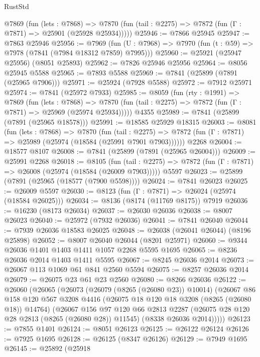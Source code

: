 \begin{lexlean}{RustStd}
\begin{coremodule}
{\begin{coremodule}
{{{{{{{{{{{{{{{{{{{{{{{{{{{{{{{{{{{{{{{{{{{{{{{{{{{{{{    @7869
      (fun (lets : @7868) =>
      @7870 (fun (tail : @2275) => @7872 (fun (Γ : @7871) => @25901 (@25928 @25934)))))
@25946 := @7866 @25945
@25947 := @7863 @25946
@25956 := @7969
    (fun (U : @7968) => @7970 (fun (t : @59) => @7978 (@7841 (@7984 @18312 @7859) @7995)))
@25960 := @25921 (@25947 @25956) (@8051 @25893)
@25962 := @7826 @25946 @25956
@25964 := @8056 @25945 @5588
@25965 := @7893 @5588
@25969 := @7841 (@25899 (@7891 (@25965 @7906)))
@25971 := @25924 (@7928 @5588)
@25972 := @7912 @25971
@25974 := @7841 (@25972 @7933)
@25985 := @8059
    (fun (rty : @1991) =>
    @7869
      (fun (lets : @7868) =>
      @7870 (fun (tail : @2275) => @7872 (fun (Γ : @7871) => @25969 (@25974 @25934)))))
    @4355
@25989 := @7841 (@25899 (@7891 (@25965 @18578)))
@25991 := @18585 @25929 @18315
@26003 := @8081
    (fun (lets : @7868) =>
    @7870
      (fun (tail : @2275) =>
      @7872 (fun (Γ : @7871) => @25989 (@25974 (@18584 (@25991 @7901 @7903))))))
    @2268
@26004 := @18577 @8107
@26008 := @7841 (@25899 (@7891 (@25965 @26004)))
@26009 := @25991 @2268
@26018 := @8105
    (fun (tail : @2275) => @7872 (fun (Γ : @7871) => @26008 (@25974 (@18584 (@26009 @7903)))))
    @5597
@26023 := @25899 (@7891 (@25965 (@18577 (@7900 @5598))))
@26024 := @7841 @26023
@26025 := @26009 @5597
@26030 := @8123 (fun (Γ : @7871) => @26024 (@25974 (@18584 @26025)))
@26034 := @8136 (@8174 (@11769 @8175)) @7919
@26036 := @16230 (@8173 @26034)
@26037 := @26030 @26036
@26038 := @8007 @26023
@26040 := @25972 (@7932 @26036)
@26041 := @7841 @26040
@26044 := @7939 @26036 @18583 @26025
@26048 := @26038 (@26041 @26044) (@8196 @25898)
@26052 := @8007 @26040 @26044 (@8201 @25971)
@26060 := @9344 @26036 @1401 @1403 @1411 @1057 @2268 @5595 @1695
@26065 := @8236 @26036 @2014 @1403 @1411 @5595
@26067 := @8245 @26036 @2014
@26073 := @26067 @113 @1069 @61 @841 @2560 @5594
@26075 := @8257 @26036 @2014
@26079 := @26075 @23 @61 @23 @2560
@26080 := @8266 @26036
@26122 := @26060
    (@26065
      (@26073
        (@26079 (@8265 (@26080 @23)) @10014)
        (@26067
          @86
          @158
          @120
          @567
          @3208
          @4416
          (@26075 @18 @120 @18 @3208 (@8265 (@26080 @18)) @14764)
          (@26067
            @156
            @97
            @120
            @66
            @2813
            @2287
            (@26075 @28 @120 @28 @2813 (@8265 (@26080 @28)) @11545)
            (@8338 @26036 @2014)))))
@26123 := @7855 @1401
@26124 := @8051 @26123
@26125 := @26122 @26124
@26126 := @7925 @1695
@26128 := @26125 (@8347 @26126)
@26129 := @7949 @1695
@26145 := @25892
    (@25918
}}}}}}}}}}}}}}}}}}}}}}}}}}}}}}}}}}}}}}}}}}}}}}}}}}}}}}
\end{coremodule}}
\end{coremodule}
\end{lexlean}
